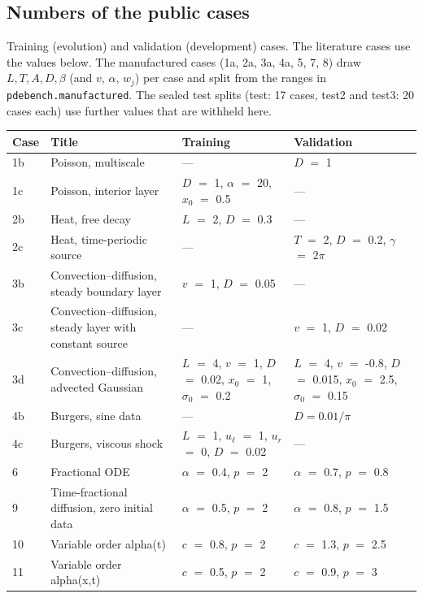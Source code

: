 \documentclass[11pt]{article}
\begin{document}
\subsection*{Numbers of the public cases}
Training (evolution) and validation (development) cases. The literature cases use the values below. The manufactured cases (1a, 2a, 3a, 4a, 5, 7, 8) draw $L,T,A,D,\beta$ (and $v$, $\alpha$, $w_j$) per case and split from the ranges in \texttt{pdebench.manufactured}. The sealed test splits (test: 17 cases, test2 and test3: 20 cases each) use further values that are withheld here.
\begin{center}
\footnotesize
\begin{tabular}{lp{3.6cm}p{4.6cm}p{4.6cm}}
\toprule
Case & Title & Training & Validation \\
\midrule
1b & Poisson, multiscale & --- & $D$ $=$ 1 \\
1c & Poisson, interior layer & $D$ $=$ 1, $\alpha$ $=$ 20, $x_0$ $=$ 0.5 & --- \\
2b & Heat, free decay & $L$ $=$ 2, $D$ $=$ 0.3 & --- \\
2c & Heat, time-periodic source & --- & $T$ $=$ 2, $D$ $=$ 0.2, $\gamma$ $=$ $2\pi$ \\
3b & Convection--diffusion, steady boundary layer & $v$ $=$ 1, $D$ $=$ 0.05 & --- \\
3c & Convection--diffusion, steady layer with constant source & --- & $v$ $=$ 1, $D$ $=$ 0.02 \\
3d & Convection--diffusion, advected Gaussian & $L$ $=$ 4, $v$ $=$ 1, $D$ $=$ 0.02, $x_0$ $=$ 1, $\sigma_0$ $=$ 0.2 & $L$ $=$ 4, $v$ $=$ -0.8, $D$ $=$ 0.015, $x_0$ $=$ 2.5, $\sigma_0$ $=$ 0.15 \\
4b & Burgers, sine data & --- & $D=0.01/\pi$ \\
4c & Burgers, viscous shock & $L$ $=$ 1, $u_\ell$ $=$ 1, $u_r$ $=$ 0, $D$ $=$ 0.02 & --- \\
6 & Fractional ODE & $\alpha$ $=$ 0.4, $p$ $=$ 2 & $\alpha$ $=$ 0.7, $p$ $=$ 0.8 \\
9 & Time-fractional diffusion, zero initial data & $\alpha$ $=$ 0.5, $p$ $=$ 2 & $\alpha$ $=$ 0.8, $p$ $=$ 1.5 \\
10 & Variable order alpha(t) & $c$ $=$ 0.8, $p$ $=$ 2 & $c$ $=$ 1.3, $p$ $=$ 2.5 \\
11 & Variable order alpha(x,t) & $c$ $=$ 0.5, $p$ $=$ 2 & $c$ $=$ 0.9, $p$ $=$ 3 \\
\bottomrule
\end{tabular}
\end{center}
\end{document}
